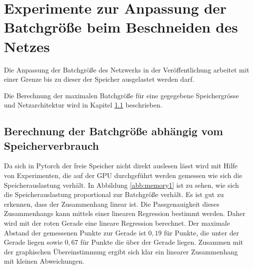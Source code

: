 \section{Experimente zur Anpassung der Batchgröße beim Beschneiden des Netzes}\label{sec:ptnew}

Die Anpassung der Batchgröße des Netzwerks in der Veröffentlichung arbeitet mit einer Grenze bis zu dieser der Speicher ausgelastet werden darf. 

Die Berechnung der maximalen Batchgröße für eine gegegebene Speichergrösse und Netzarchitektur wird in Kapitel \ref{sec:batch} beschrieben.

\subsection{Berechnung der Batchgröße abhängig vom Speicherverbrauch}\label{sec:batch}
Da sich in Pytorch der freie Speicher nicht direkt auslesen lässt wird mit Hilfe von Experimenten, die auf der GPU durchgeführt werden gemessen wie sich die Speicherauslastung verhält. In Abbildung \ref{abb:memory1} ist zu sehen, wie sich die Speicherauslastung proportional zur Batchgröße verhält. Es ist gut zu erkennen, dass der Zusammenhang linear ist. Die Passgenauigkeit dieses Zusammenhangs kann mittels einer linearen Regression bestimmt werden.  Daher wird mit der roten Gerade eine lineare Regression berechnet. Der maximale Abstand der gemessenen Punkte zur Gerade ist $0,19$ für Punkte, die unter der Gerade liegen sowie $0,67$ für Punkte die über der Gerade liegen. Zusammen mit der graphischen Übereinstimmung ergibt sich klar ein linearer Zusammenhang mit kleinen Abweichungen.
